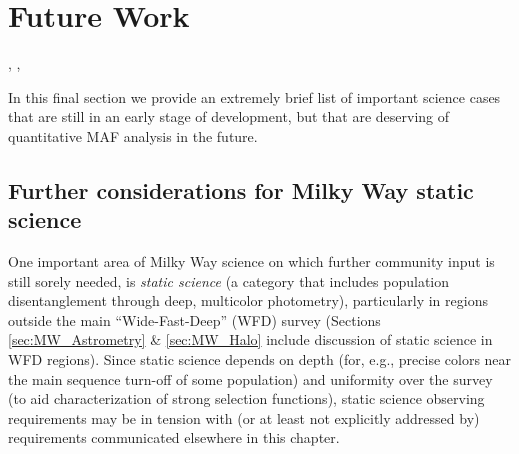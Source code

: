 %
%

\section{Future Work}
\def\secname{MW_future}\label{sec:\secname}


% 



% 



, , 

In this final section we provide an extremely brief list of important science
cases that are still in an early stage of development, but that are
deserving of quantitative MAF analysis in the future.

\subsection{Further considerations for Milky Way static science}

  One important area of Milky Way science on which further
  community input is still sorely needed, is {\it static science} (a
  category that includes population disentanglement through deep,
  multicolor photometry), particularly in regions outside the main
  ``Wide-Fast-Deep'' (WFD) survey (Sections \ref{sec:MW_Astrometry} \&
  \ref{sec:MW_Halo} include discussion of static science in WFD regions). Since
  static science depends on depth (for, e.g., precise colors near the
  main sequence turn-off of some population) and uniformity over the
  survey (to aid characterization of strong selection functions),
  static science observing requirements may be in tension with (or at
  least not explicitly addressed by) requirements communicated
  elsewhere in this chapter.

